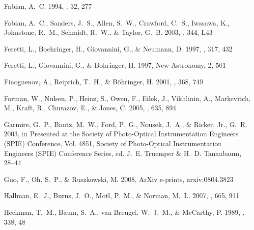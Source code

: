 \documentclass[12pt,preprint]{aastex}
\begin{document}
\begin{thebibliography}{137}
{Fabian}, A.~C. 1994, \araa, 32, 277

{Fabian}, A.~C., {Sanders}, J.~S., {Allen}, S.~W., {Crawford}, C.~S.,
  {Iwasawa}, K., {Johnstone}, R.~M., {Schmidt}, R.~W., \& {Taylor}, G.~B. 2003,
  \mnras, 344, L43

{Feretti}, L., {Boehringer}, H., {Giovannini}, G., \& {Neumann}, D.
  1997{}, \aap, 317, 432

{Feretti}, L., {Giovannini}, G., \& {Bohringer}, H. 1997{}, New
  Astronomy, 2, 501

{Finoguenov}, A., {Reiprich}, T.~H., \& {B{\"o}hringer}, H. 2001, \aap, 368,
  749

{Forman}, W., {Nulsen}, P., {Heinz}, S., {Owen}, F., {Eilek}, J., {Vikhlinin},
  A., {Markevitch}, M., {Kraft}, R., {Churazov}, E., \& {Jones}, C. 2005, \apj,
  635, 894

{Garmire}, G.~P., {Bautz}, M.~W., {Ford}, P.~G., {Nousek}, J.~A., \& {Ricker},
  Jr., G.~R. 2003, in Presented at the Society of Photo-Optical Instrumentation
  Engineers (SPIE) Conference, Vol. 4851, Society of Photo-Optical
  Instrumentation Engineers (SPIE) Conference Series, ed. J.~E. {Truemper} \&
  H.~D. {Tananbaum}, 28--44

{Guo}, F., {Oh}, S.~P., \& {Ruszkowski}, M. 2008, ArXiv e-prints,
  arxiv:0804.3823

{Hallman}, E.~J., {Burns}, J.~O., {Motl}, P.~M., \& {Norman}, M.~L. 2007, \apj,
  665, 911

{Heckman}, T.~M., {Baum}, S.~A., {van Breugel}, W.~J.~M., \& {McCarthy}, P.
  1989, \apj, 338, 48


\end{thebibliography}
\end{document}
